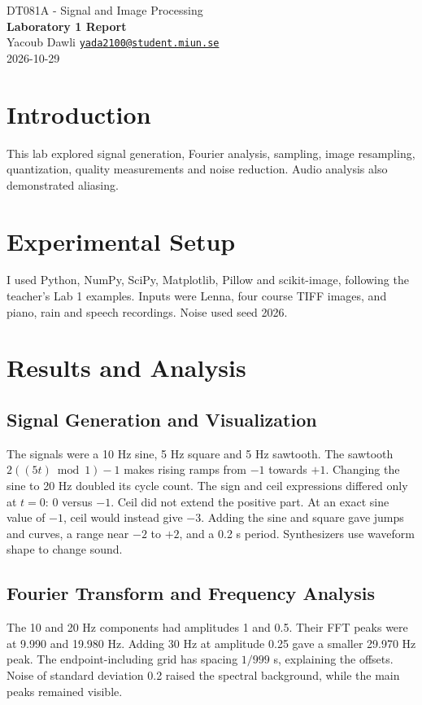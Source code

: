 \documentclass[11pt,a4paper]{article}
\begin{document}
\fontsize{10.5}{12.5}\selectfont
\begin{center}
{\large DT081A - Signal and Image Processing}\\[2pt]
{\Large\bfseries Laboratory 1 Report}\\[3pt]
Yacoub Dawli \quad \href{mailto:yada2100@student.miun.se}{\texttt{yada2100@student.miun.se}}\\[2pt]
2026-10-29
\end{center}
\vspace{-5pt}

\section{Introduction}
This lab explored signal generation, Fourier analysis, sampling, image
resampling, quantization, quality measurements and noise reduction. Audio
analysis also demonstrated aliasing.

\section{Experimental Setup}
I used Python, NumPy, SciPy, Matplotlib, Pillow and scikit-image, following the
teacher's Lab 1 examples. Inputs were Lenna, four course TIFF images, and piano,
rain and speech recordings. Noise used seed 2026.

\section{Results and Analysis}
\subsection{Signal Generation and Visualization}
The signals were a 10 Hz sine, 5 Hz square and 5 Hz sawtooth.
The sawtooth \(2((5t)\bmod 1)-1\) makes rising ramps from \(-1\) towards \(+1\).
Changing the sine to 20 Hz doubled its cycle count.
The sign and ceil expressions differed only at \(t=0\): 0 versus \(-1\).
Ceil did not extend the positive part.
At an exact sine value of \(-1\), ceil would instead give \(-3\).
Adding the sine and square gave jumps and curves, a range near \(-2\) to \(+2\),
and a 0.2 s period. Synthesizers use waveform shape to change sound.

\subsection{Fourier Transform and Frequency Analysis}
The 10 and 20 Hz components had amplitudes 1 and 0.5. Their FFT peaks were at
9.990 and 19.980 Hz. Adding 30 Hz at amplitude 0.25 gave a smaller
29.970 Hz peak. The endpoint-including grid has spacing \(1/999\) s, explaining
the offsets. Noise of standard deviation 0.2 raised
the spectral background, while the main peaks remained visible.
\end{document}
